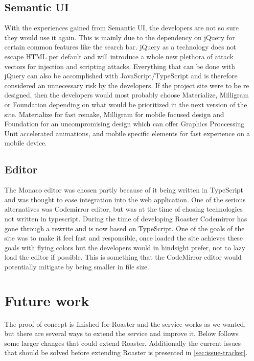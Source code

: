 \documentclass[12pt,a4paper]{report}
\begin{document}
\section{Semantic UI}
With the experiences gained from Semantic UI, the developers are not so sure they would use it again. This is mainly due to the dependency on jQuery for certain common features like the search bar. jQuery as a technology does not escape HTML per default and will introduce a whole new plethora of attack vectors for injection and scripting attacks. Everything that can be done with jQuery can also be accomplished with JavaScript/TypeScript and is therefore considered an unnecessary risk by the developers.
If the project site were to be re designed, then the developers would most probably choose Materialize, Milligram or Foundation depending on what would be prioritized in the next version of the site. Materialize for fast remake, Milligram for mobile focused design and Foundation for an uncompromising design which can offer Graphics Proccessing Unit accelerated animations, and mobile specific elements for fast experience on a mobile device.

\section{Editor}
The Monaco editor was chosen partly because of it being written in TypeScript and was thought to ease integration into the web application. One of the serious alternatives was Codemirror editor, but was at the time of chosing technologies not written in typescript. During the time of developing Roaster Codemirror has gone through a rewrite and is now based on TypeScript\cite{codemirror-ts}. One of the goals of the site was to make it feel fast and responsible, once loaded the site achieves these goals with flying colors but the developers would in hindsight prefer, not to lazy load the editor if possible. This is something that the CodeMirror editor would potentially mitigate by being smaller in file size.

\chapter{Future work}
\label{sec:future-work}
The proof of concept is finished for Roaster and the service works as we wanted, but there are several ways to extend the service and improve it. Below follows some larger changes that could extend Roaster. Additionally the current issues that should be solved before extending Roaster is presented in \autoref{sec:issue-tracker}.
\end{document}
